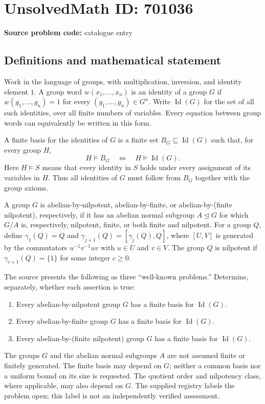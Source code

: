 \documentclass[11pt]{article}
\begin{document}
\section*{UnsolvedMath ID: 701036}
\textbf{Source problem code:} catalogue entry
\subsection{Definitions and mathematical statement}
Work in the language of groups, with multiplication, inversion, and identity element \(1\). A group word \(w(x_1,\ldots,x_n)\) is an identity of a group \(G\) if \(w(g_1,\ldots,g_n)=1\) for every \((g_1,\ldots,g_n)\in G^n\). Write \(\operatorname{Id}(G)\) for the set of all such identities, over all finite numbers of variables. Every equation between group words can equivalently be written in this form.

A finite basis for the identities of \(G\) is a finite set \(B_G\subseteq\operatorname{Id}(G)\) such that, for every group \(H\),
\[
 H\models B_G
 \quad\Longleftrightarrow\quad
 H\models\operatorname{Id}(G).
\]
Here \(H\models S\) means that every identity in \(S\) holds under every assignment of its variables in \(H\). Thus all identities of \(G\) must follow from \(B_G\) together with the group axioms.

A group \(G\) is abelian-by-nilpotent, abelian-by-finite, or abelian-by-(finite nilpotent), respectively, if it has an abelian normal subgroup \(A\trianglelefteq G\) for which \(G/A\) is, respectively, nilpotent, finite, or both finite and nilpotent. For a group \(Q\), define \(\gamma_1(Q)=Q\) and \(\gamma_{j+1}(Q)=[\gamma_j(Q),Q]\), where \([U,V]\) is generated by the commutators \(u^{-1}v^{-1}uv\) with \(u\in U\) and \(v\in V\). The group \(Q\) is nilpotent if \(\gamma_{c+1}(Q)=\{1\}\) for some integer \(c\geq 0\).

The source presents the following as three ``well-known problems.'' Determine, separately, whether each assertion is true:
\begin{enumerate}
\item[(a)] Every abelian-by-nilpotent group \(G\) has a finite basis for \(\operatorname{Id}(G)\).
\item[(b)] Every abelian-by-finite group \(G\) has a finite basis for \(\operatorname{Id}(G)\).
\item[(c)] Every abelian-by-(finite nilpotent) group \(G\) has a finite basis for \(\operatorname{Id}(G)\).
\end{enumerate}
The groups \(G\) and the abelian normal subgroups \(A\) are not assumed finite or finitely generated. The finite basis may depend on \(G\); neither a common basis nor a uniform bound on its size is requested. The quotient order and nilpotency class, where applicable, may also depend on \(G\). The supplied registry labels the problem open; this label is not an independently verified assessment.
\end{document}

